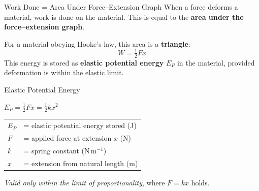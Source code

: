 \begin{definitionbox}{Work Done = Area Under Force--Extension Graph}
When a force deforms a material, work is done on the material. This is equal to the \textbf{area under the force--extension graph}.

For a material obeying Hooke's law, this area is a \textbf{triangle}:
$$W = \tfrac{1}{2} F x$$
This energy is stored as \textbf{elastic potential energy} $E_P$ in the material, provided deformation is within the elastic limit.
\end{definitionbox}

\begin{formulabox}{Elastic Potential Energy }
\begin{center}
\Large $E_P = \tfrac{1}{2}Fx = \tfrac{1}{2}kx^2$
\end{center}
\vspace{0.3em}
\begin{tabular}{@{}ll@{}}
$E_P$ & = elastic potential energy stored (J) \\
$F$   & = applied force at extension $x$ (N) \\
$k$   & = spring constant (N\,m$^{-1}$) \\
$x$   & = extension from natural length (m) \\
\end{tabular}

\vspace{0.5em}
\textit{Valid only within the limit of proportionality}, where $F = kx$ holds.
\end{formulabox}

\begin{center}
\end{center}

